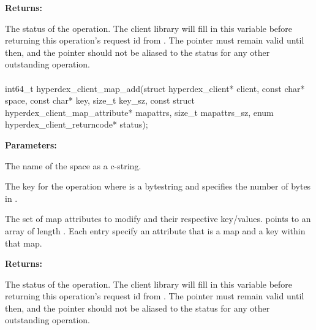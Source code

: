 \noindent\textbf{Returns:}
\begin{description}[labelindent=\widthof{{\code{status}}},leftmargin=*,noitemsep,nolistsep,align=right]
\item[\code{status}] The status of the operation.  The client library will fill in this variable before returning this operation's request id from .  The pointer must remain valid until then, and the pointer should not be aliased to the status for any other outstanding operation.
\end{description}

\paragraph{}
\begin{ccode}
int64_t hyperdex_client_map_add(struct hyperdex_client* client,
                const char* space,
                const char* key, size_t key_sz,
                const struct hyperdex_client_map_attribute* mapattrs, size_t mapattrs_sz,
                enum hyperdex_client_returncode* status);
\end{ccode}
\funcdesc 

\noindent\textbf{Parameters:}
\begin{description}[labelindent=\widthof{{\code{mapattrs}, \code{mapattrs\_sz}}},leftmargin=*,noitemsep,nolistsep,align=right]
\item[\code{space}] The name of the space as a c-string.
\item[\code{key}, \code{key\_sz}] The key for the operation where  is a bytestring and  specifies the number of bytes in .
\item[\code{mapattrs}, \code{mapattrs\_sz}] The set of map attributes to modify and their respective key/values.   points to an array of length .  Each entry specify an attribute that is a map and a key within that map.
\end{description}

\noindent\textbf{Returns:}
\begin{description}[labelindent=\widthof{{\code{status}}},leftmargin=*,noitemsep,nolistsep,align=right]
\item[\code{status}] The status of the operation.  The client library will fill in this variable before returning this operation's request id from .  The pointer must remain valid until then, and the pointer should not be aliased to the status for any other outstanding operation.
\end{description}

